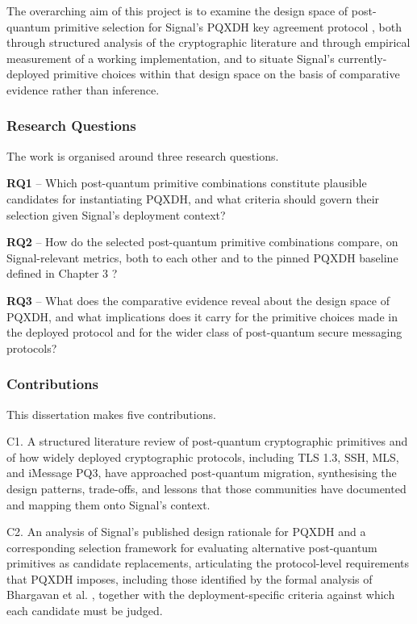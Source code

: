 The overarching aim of this project is to examine the design space of post-quantum primitive selection for Signal's PQXDH key agreement protocol \cite{kret_pqxdh_nodate}, both through structured analysis of the cryptographic literature and through empirical measurement of a working implementation, and to situate Signal's currently-deployed primitive choices within that design space on the basis of comparative evidence rather than inference.

\subsubsection{Research Questions}
\label{subsubsec:research-questions}

The work is organised around three research questions.

\textbf{RQ1} -- Which post-quantum primitive combinations constitute plausible candidates for instantiating PQXDH, and what criteria should govern their selection given Signal's deployment context?

\textbf{RQ2} -- How do the selected post-quantum primitive combinations compare, on Signal-relevant metrics, both to each other and to the pinned PQXDH baseline defined in Chapter 3 \cite{kret_pqxdh_nodate}?

\textbf{RQ3} -- What does the comparative evidence reveal about the design space of PQXDH, and what implications does it carry for the primitive choices made in the deployed protocol and for the wider class of post-quantum secure messaging protocols?

\subsubsection{Contributions}
\label{subsubsec:introduction-contributions}

This dissertation makes five contributions.

C1. A structured literature review of post-quantum cryptographic primitives and of how widely deployed cryptographic protocols, including TLS 1.3, SSH, MLS, and iMessage PQ3, have approached post-quantum migration, synthesising the design patterns, trade-offs, and lessons that those communities have documented and mapping them onto Signal's context.

C2. An analysis of Signal's published design rationale for PQXDH \cite{kret_pqxdh_nodate, kret_quantum_nodate} and a corresponding selection framework for evaluating alternative post-quantum primitives as candidate replacements, articulating the protocol-level requirements that PQXDH imposes, including those identified by the formal analysis of Bhargavan et al. \cite{bhargavan_formal_2024}, together with the deployment-specific criteria against which each candidate must be judged.

